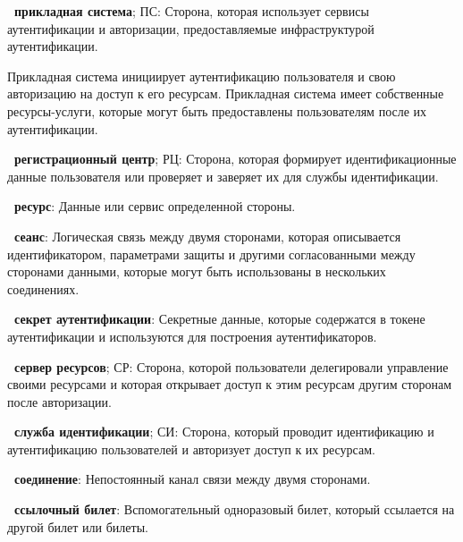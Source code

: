 
{\bf \thedefctr~прикладная система}; ПС:
Сторона, которая использует сервисы аутентификации и авторизации,
предоставляемые инфраструктурой аутентификации.

\begin{note*}
Прикладная система инициирует аутентификацию пользователя 
и свою авторизацию на доступ к его ресурсам.
%
Прикладная система имеет собственные ресурсы-услуги, 
которые могут быть предоставлены пользователям после их аутентификации.
\end{note*}

{\bf \thedefctr~регистрационный центр}; РЦ:
Сторона, которая формирует идентификационные данные пользователя
или проверяет и заверяет их для службы идентификации. 


{\bf \thedefctr~ресурс}:
Данные или сервис определенной стороны. 


{\bf \thedefctr~сеанс}:
Логическая связь между двумя сторонами, которая описывается 
идентификатором, параметрами защиты и другими согласованными между 
сторонами данными, которые могут быть использованы в нескольких 
соединениях. 

{\bf \thedefctr~секрет аутентификации}:
Секретные данные, которые содержатся в токене аутентификации
и используются для построения аутентификаторов.

{\bf \thedefctr~сервер ресурсов}; СР:
Сторона, которой пользователи делегировали управление своими ресурсами и которая
открывает доступ к этим ресурсам другим сторонам после авторизации.

{\bf \thedefctr~служба идентификации}; СИ:
Сторона, который проводит идентификацию и аутентификацию пользователей 
и авторизует доступ к их ресурсам.
	
{\bf \thedefctr~соединение}:
Непостоянный канал связи между двумя сторонами. 

{\bf \thedefctr~ссылочный билет}:
Вспомогательный одноразовый билет, который ссылается на другой билет или 
билеты.


